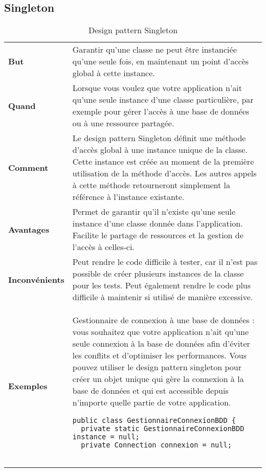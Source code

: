 \newpage
\subsection{Singleton}
\begin{table}[H]
\caption{Design pattern Singleton}
\label{tbl:design_pattern_singleton}
\begin{adjustbox}{max width=\textwidth}
\begin{tabular}{l|p{\textwidth}}
\toprule
\textbf{But} & Garantir qu'une classe ne peut être instanciée qu'une seule fois, en maintenant un point d'accès global à cette instance.\\
\cmidrule(lr){1-2}
\textbf{Quand} & Lorsque vous voulez que votre application n'ait qu'une seule instance d'une classe particulière, par exemple pour gérer l'accès à une base de données ou à une ressource partagée.\\
\cmidrule(lr){1-2}
\textbf{Comment} & Le design pattern Singleton définit une méthode d'accès global à une instance unique de la classe. Cette instance est créée au moment de la première utilisation de la méthode d'accès. Les autres appels à cette méthode retourneront simplement la référence à l'instance existante.\\
\cmidrule(lr){1-2}
\textbf{Avantages} & Permet de garantir qu'il n'existe qu'une seule instance d'une classe donnée dans l'application. Facilite le partage de ressources et la gestion de l'accès à celles-ci.\\
\cmidrule(lr){1-2}
\textbf{Inconvénients} & Peut rendre le code difficile à tester, car il n'est pas possible de créer plusieurs instances de la classe pour les tests. Peut également rendre le code plus difficile à maintenir si utilisé de manière excessive.\\
\cmidrule(lr){1-2}
\textbf{Exemples} &
\hspace{4mm}
\begin{minipage}[tl]{0.5\textwidth}
\begin{minipage}[t]{1\textwidth}
Gestionnaire de connexion à une base de données : vous souhaitez que votre application n'ait qu'une seule connexion à la base de données afin d'éviter les conflits et d'optimiser les performances. Vous pouvez utiliser le design pattern singleton pour créer un objet unique qui gère la connexion à la base de données et qui est accessible depuis n'importe quelle partie de votre application.
\end{minipage}
\begin{minipage}[b]{1\textwidth}
\begin{lstlisting}[style=monstyle]
public class GestionnaireConnexionBDD {
  private static GestionnaireConnexionBDD instance = null;
  private Connection connexion = null;


\end{lstlisting}
\end{minipage}
\end{minipage}
\end{tabular}
\end{adjustbox}
\end{table}
